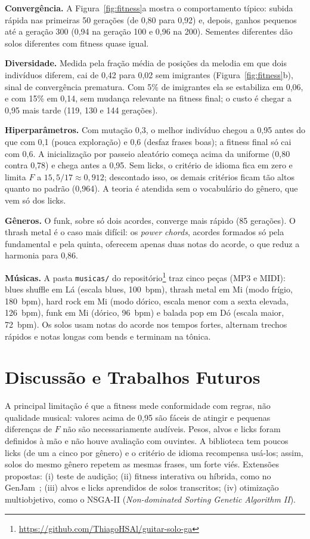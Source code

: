 \documentclass{article}
\begin{document}
\textbf{Convergência.} A Figura~\ref{fig:fitness}a mostra o comportamento típico: subida
rápida nas primeiras 50 gerações (de 0,80 para 0,92) e, depois, ganhos pequenos até a
geração 300 (0,94 na geração 100 e 0,96 na 200). Sementes diferentes dão solos
diferentes com fitness quase igual.

\textbf{Diversidade.} Medida pela fração média de posições da melodia em que dois
indivíduos diferem, cai de 0,42 para 0,02 sem imigrantes (Figura~\ref{fig:fitness}b),
sinal de convergência prematura. Com 5\% de imigrantes ela se estabiliza em 0,06, e com
15\% em 0,14, sem mudança relevante na fitness final; o custo é chegar a 0,95 mais
tarde (119, 130 e 144 gerações).

\textbf{Hiperparâmetros.} Com mutação 0,3, o melhor indivíduo chegou a 0,95 antes
do que com 0,1 (pouca exploração) e 0,6 (desfaz frases boas); a fitness final só cai
com 0,6. A inicialização por passeio aleatório começa acima da uniforme (0,80 contra
0,78) e chega antes a 0,95. Sem licks, o
critério de idioma fica em zero e limita $F$ a $15{,}5/17\approx0{,}912$; descontado
isso, os demais critérios ficam tão altos quanto no padrão (0,964). A teoria é atendida sem o vocabulário do gênero, que vem só dos licks.

\textbf{Gêneros.} O funk, sobre só dois acordes, converge mais rápido (85
gerações). O thrash metal é o
caso mais difícil: os \emph{power chords}, acordes formados só pela fundamental e pela
quinta, oferecem apenas duas notas do acorde, o que reduz a harmonia para 0,86.

\textbf{Músicas.} A pasta \texttt{musicas/} do
repositório\footnote{\url{https://github.com/ThiagoHSAl/guitar-solo-ga}} traz cinco
peças (MP3 e MIDI): blues shuffle em Lá (escala blues, 100~bpm), thrash metal em Mi (modo
frígio, 180~bpm), hard rock em Mi (modo dórico, escala menor com a sexta elevada,
126~bpm), funk em Mi (dórico, 96~bpm) e balada pop em Dó (escala maior, 72~bpm).
Os solos usam notas do acorde nos tempos fortes, alternam trechos rápidos e notas
longas com bends e terminam na tônica.

\section{Discussão e Trabalhos Futuros}

A principal limitação é que a fitness mede conformidade com regras, não qualidade
musical: valores acima de 0,95 são fáceis de atingir e pequenas diferenças de $F$ não
são necessariamente audíveis. Pesos, alvos e licks foram definidos à mão e não houve avaliação com ouvintes. A
biblioteca tem poucos licks (de um a cinco por gênero) e o critério de idioma
recompensa usá-los; assim, solos do mesmo gênero repetem as mesmas frases, um forte
viés. Extensões propostas:
(i) teste de audição; (ii) fitness interativa ou híbrida, como no
GenJam~\cite{biles1994}; (iii) alvos e licks aprendidos de solos transcritos; (iv)
otimização multiobjetivo, como o NSGA-II (\emph{Non-dominated Sorting Genetic Algorithm
II}).


\end{document}
